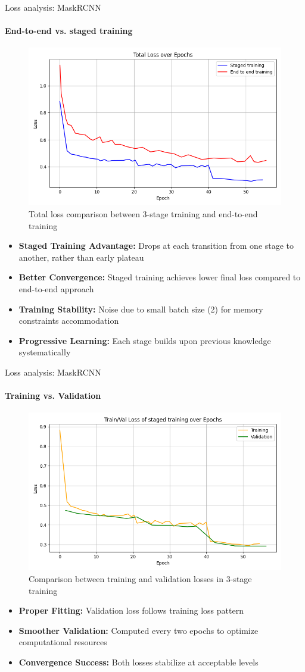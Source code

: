 \documentclass[8pt,aspectratio=169,xcolor=dvipsnames]{beamer}
\begin{document}
\begin{frame}{Loss analysis: MaskRCNN}
\framesubtitle{End-to-end vs. staged training}
\begin{figure}
    \centering
    \includegraphics[width=0.5\linewidth]{loss_staged_end.png}
    \caption{Total loss comparison between 3-stage training and end-to-end training}
    \label{fig:mrcnn_stagevsend}
\end{figure}
\begin{itemize}
    \item \textbf{Staged Training Advantage:} Drops at each transition from one stage to another, rather than early plateau
    \item \textbf{Better Convergence:} Staged training achieves lower final loss compared to end-to-end approach
    \item \textbf{Training Stability:} Noise due to small batch size (2) for memory constraints accommodation
    \item \textbf{Progressive Learning:} Each stage builds upon previous knowledge systematically
\end{itemize}
\end{frame}

\begin{frame}{Loss analysis: MaskRCNN}
\framesubtitle{Training vs. Validation}
\begin{figure}
    \centering
    \includegraphics[width=0.5\linewidth]{loss_staged_train_val.png}
    \caption{Comparison between training and validation losses in 3-stage training}
    \label{fig:mrcnn_train_val}
\end{figure}
\begin{itemize}
    \item \textbf{Proper Fitting:} Validation loss follows training loss pattern
    \item \textbf{Smoother Validation:} Computed every two epochs to optimize computational resources
    \item \textbf{Convergence Success:} Both losses stabilize at acceptable levels
\end{itemize}
\end{frame}
\end{document}
